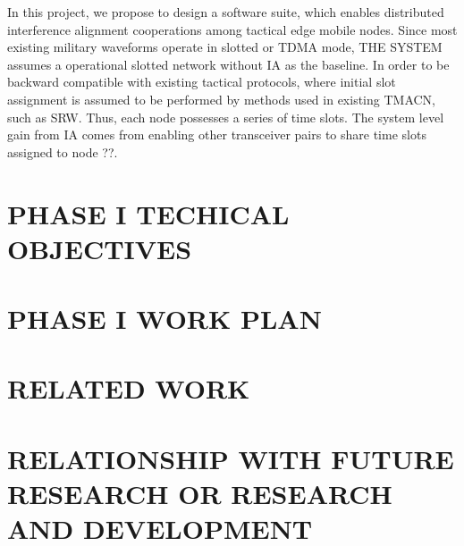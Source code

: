 \documentclass[letterpaper,11pt,onecolumn]{article}
\begin{document}

In this project, we propose to design a software suite, which enables distributed interference alignment cooperations among tactical edge mobile nodes.  Since most existing military waveforms operate in slotted or TDMA mode, THE SYSTEM assumes a operational slotted network without IA as the baseline. In order to be backward compatible with existing tactical protocols,  where initial slot assignment is assumed to be performed by methods used in existing TMACN, such as SRW. Thus, each node possesses a series of time slots. The system level gain from IA comes from enabling other transceiver pairs to share time slots assigned to node ??. 

\section{PHASE I TECHICAL OBJECTIVES}

\section{PHASE I WORK PLAN}

\section{RELATED WORK}

\section{RELATIONSHIP WITH FUTURE RESEARCH OR RESEARCH AND DEVELOPMENT}
\end{document}
